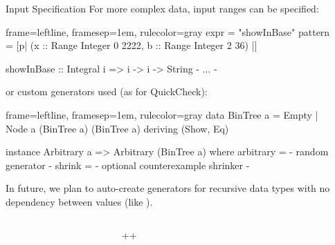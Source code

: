 \documentclass[final, 20pt, a0]{beamer}
\newlength{\sepwid}
\newlength{\marginwid}
\newlength{\onecolwid}
\newlength{\twocolwid}
\begin{document}
\begin{frame}[t,fragile]
\begin{columns}[t]
\begin{column}{\twocolwid}
\begin{block}{Input Specification}
  For more complex data, input ranges can be specified:
  \begin{hscode*}{frame=leftline, framesep=1em, rulecolor=gray}
    expr = "showInBase"
    pattern = [p| (x :: Range Integer 0 2222, b :: Range Integer 2 36) |]

    showInBase :: Integral i => i -> i -> String
    {- ... -}
  \end{hscode*}

  or custom generators used (as for QuickCheck):
  \begin{hscode*}{frame=leftline, framesep=1em, rulecolor=gray}
    data BinTree a = Empty | Node a (BinTree a) (BinTree a)
                     deriving (Show, Eq)

    instance Arbitrary a => Arbitrary (BinTree a) where
        arbitrary = {- random generator -}
        shrink = {- optional counterexample shrinker -}
  \end{hscode*}

  In future, we plan to auto-create generators for recursive data types with no dependency between values (like ).
\end{block}

\end{column} %

\begin{column}{\marginwid}\end{column} %

\end{columns}
\begin{columns}[t] %

\begin{column}{\marginwid}\end{column} %
\begin{column}{\onecolwid+\sepwid+\twocolwid}


\end{column}

\begin{column}{\marginwid}\end{column} %

\end{columns}

\end{frame}
\end{document}
